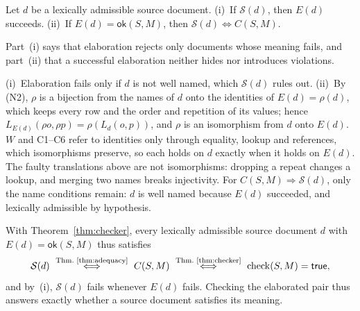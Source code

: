 \begin{theorem}\label{thm:adequacy}
Let $d$ be a lexically admissible source document. (i)~If $\mathcal S(d)$, then
$E(d)$ succeeds. (ii)~If $E(d)=\mathsf{ok}(S,M)$, then $\mathcal S(d)\Leftrightarrow C(S,M)$.
\end{theorem}
Part~(i) says that elaboration rejects only documents whose meaning fails, and
part~(ii) that a successful elaboration neither hides nor introduces violations.
\begin{proofsketch}
(i)~Elaboration fails only if $d$ is not well named, which $\mathcal S(d)$ rules
out. (ii)~By (N2), $\rho$ is a bijection from the names of $d$ onto the identities of
$E(d)=\rho(d)$, which keeps every row and the order and repetition of its
values; hence $L_{E(d)}(\rho o,\rho p)=\rho(L_d(o,p))$, and $\rho$ is an
isomorphism from $d$ onto $E(d)$. $W$ and C1--C6 refer to identities only
through equality, lookup and references, which isomorphisms preserve, so each
holds on $d$ exactly when it holds on $E(d)$. The faulty translations above are
not isomorphisms: dropping a repeat changes a lookup, and merging two names
breaks injectivity. For $C(S,M)\Rightarrow\mathcal S(d)$, only the name conditions
remain: $d$ is well named because $E(d)$ succeeded, and lexically admissible by
hypothesis.
\end{proofsketch}
With Theorem~\ref{thm:checker}, every lexically admissible source document $d$
with $E(d)=\mathsf{ok}(S,M)$ thus satisfies
\begin{equation}
 \mathcal S(d)
 \ \overset{\text{Thm.~\ref{thm:adequacy}}}{\Longleftrightarrow}\
 C(S,M)
 \ \overset{\text{Thm.~\ref{thm:checker}}}{\Longleftrightarrow}\
 \operatorname{check}(S,M)=\mathsf{true},
\label{eq:adequacy}
\end{equation}
and by~(i), $\mathcal S(d)$ fails whenever $E(d)$ fails. Checking the elaborated
pair thus answers exactly whether a source document satisfies its meaning.
